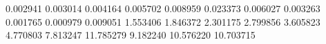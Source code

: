 0.002941
0.003014
0.004164
0.005702
0.008959
0.023373
0.006027
0.003263
0.001765
0.000979
0.009051
1.553406
1.846372
2.301175
2.799856
3.605823
4.770803
7.813247
11.785279
9.182240
10.576220
10.703715
